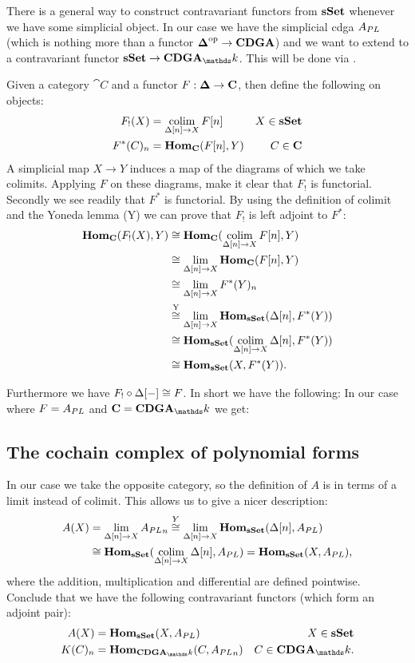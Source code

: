 
There is a general way to construct contravariant functors from $\mathbf{s{\mathbf{Set}}}$ whenever we have some simplicial object. In our case we have the simplicial cdga ${A_{PL}}$ (which is nothing more than a functor ${\boldsymbol{\Delta}}^{\text{op}} \to \mathbf{CDGA}$) and we want to extend to a contravariant functor $\sSet \to \CDGA_\k$. This will be done via .

Given a category $\cat{C}$ and a functor $F: \boldsymbol{\Delta} \to \mathbf{C}$, then define the following on objects:
\begin{align*}
	F_!(X)      &= \operatorname*{colim}_{\Delta[n] \to X} F[n] & X \in \mathbf{s{\mathbf{Set}}} \\
	F^\ast(C)_n &= \mathbf{Hom}_{\mathbf{C}}(F[n], Y)       & C \in \mathbf{C}
\end{align*}
A simplicial map $X \to Y$ induces a map of the diagrams of which we take colimits. Applying $F$ on these diagrams, make it clear that $F_!$ is functorial. Secondly we see readily that $F^\ast$ is functorial. By using the definition of colimit and the Yoneda lemma (Y) we can prove that $F_!$ is left adjoint to $F^\ast$:
\begin{align*}
	\mathbf{Hom}_{\mathbf{C}}(F_!(X), Y)
	&\cong \mathbf{Hom}_{\mathbf{C}}(\operatorname*{colim}_{\Delta[n] \to X} F[n], Y) \\
	&\cong \lim_{\Delta[n] \to X} \mathbf{Hom}_{\mathbf{C}}(F[n], Y) \\
	&\cong \lim_{\Delta[n] \to X} F^\ast(Y)_n \\
	&\stackrel{\text{Y}}{\cong} \lim_{\Delta[n] \to X} \mathbf{Hom}_{\mathbf{s{\mathbf{Set}}}}(\Delta[n], F^\ast(Y)) \\
	&\cong \mathbf{Hom}_{\mathbf{s{\mathbf{Set}}}}(\operatorname*{colim}_{\Delta[n] \to X} \Delta[n], F^\ast(Y)) \\
	&\cong \mathbf{Hom}_{\mathbf{s{\mathbf{Set}}}}(X, F^\ast(Y)).
\end{align*}

Furthermore we have $F_! \circ \Delta[-] \cong F$. In short we have the following:
In our case where $F = {A_{PL}}$ and $\cat{C} = \CDGA_\k$ we get:


\subsection{The cochain complex of polynomial forms}

In our case we take the opposite category, so the definition of $A$ is in terms of a limit instead of colimit. This allows us to give a nicer description:
\begin{align*}
	A(X)
	&= \lim_{\Delta[n] \to X} {A_{PL}}_n 
	\stackrel{Y}{\cong} \lim_{\Delta[n] \to X} \mathbf{Hom}_{\mathbf{s{\mathbf{Set}}}}(\Delta[n], {A_{PL}}) \\
	&\cong \mathbf{Hom}_{\mathbf{s{\mathbf{Set}}}}(\operatorname*{colim}_{\Delta[n] \to X}\Delta[n], {A_{PL}})
	= \mathbf{Hom}_{\mathbf{s{\mathbf{Set}}}}(X, {A_{PL}}),
\end{align*}
where the addition, multiplication and differential are defined pointwise. Conclude that we have the following contravariant functors (which form an adjoint pair):
\begin{align*}
	A(X) &= \Hom_\sSet(X, \Apl) & X \in \sSet \\
	K(C)_n &= \Hom_{\CDGA_\k}(C, \Apl_n) & C \in \CDGA_\k.
\end{align*}


